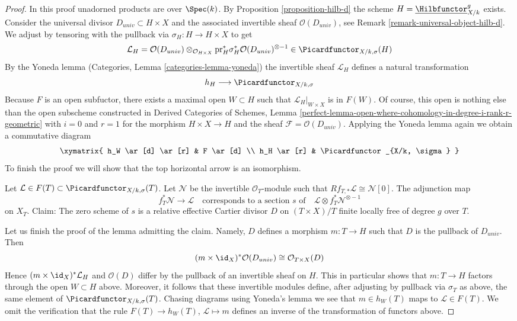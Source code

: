 \begin{proof}
In this proof unadorned products are over $\Spec(k)$.
By Proposition \ref{proposition-hilb-d} the scheme
$H = \underline{\Hilbfunctor}^g_{X/k}$ exists.
Consider the universal divisor $D_{univ} \subset H \times X$
and the associated invertible sheaf $\mathcal{O}(D_{univ})$, see
Remark \ref{remark-universal-object-hilb-d}.
We adjust by tensoring with the pullback via
$\sigma_H : H \to H \times X$ to get
$$
\mathcal{L}_H =
\mathcal{O}(D_{univ})
\otimes_{\mathcal{O}_{H \times X}}
\text{pr}_H^*\sigma_H^*\mathcal{O}(D_{univ})^{\otimes -1}
\in
\Picardfunctor_{X/k, \sigma}(H)
$$
By the Yoneda lemma (Categories, Lemma \ref{categories-lemma-yoneda})
the invertible sheaf $\mathcal{L}_H$ defines a natural transformation
$$
h_H \longrightarrow \Picardfunctor_{X/k, \sigma}
$$
Because $F$ is an open subfuctor, there exists a maximal open
$W \subset H$ such that $\mathcal{L}_H|_{W \times X}$ is in
$F(W)$. Of course, this open is nothing else than the
open subscheme constructed in
Derived Categories of Schemes, Lemma
\ref{perfect-lemma-open-where-cohomology-in-degree-i-rank-r-geometric}
with $i = 0$ and $r = 1$ for the morphism $H \times X \to H$ and the sheaf
$\mathcal{F} = \mathcal{O}(D_{univ})$. Applying the Yoneda lemma
again we obtain a commutative diagram
$$
\xymatrix{
h_W \ar[d] \ar[r] & F \ar[d] \\
h_H \ar[r] & \Picardfunctor_{X/k, \sigma}
}
$$
To finish the proof we will show that the top horizontal arrow is an
isomorphism.

\medskip\noindent
Let $\mathcal{L} \in F(T) \subset \Picardfunctor_{X/k, \sigma}(T)$.
Let $\mathcal{N}$ be the invertible $\mathcal{O}_T$-module
such that $Rf_{T, *}\mathcal{L} \cong \mathcal{N}[0]$.
The adjunction map
$$
f_T^*\mathcal{N} \longrightarrow \mathcal{L}
\quad\text{corresponds to a section }s\text{ of}\quad
\mathcal{L} \otimes f_T^*\mathcal{N}^{\otimes -1}
$$
on $X_T$. Claim: The zero scheme of $s$ is a relative effective Cartier
divisor $D$ on $(T \times X)/T$ finite locally free of degree $g$ over $T$.

\medskip\noindent
Let us finish the proof of the lemma admitting the claim.
Namely, $D$ defines a morphism $m : T \to H$ such that $D$ is the pullback of
$D_{univ}$. Then
$$
(m \times \id_X)^*\mathcal{O}(D_{univ}) \cong
\mathcal{O}_{T \times X}(D)
$$
Hence $(m \times \id_X)^*\mathcal{L}_H$ and $\mathcal{O}(D)$
differ by the pullback of an invertible sheaf on $H$. This in particular
shows that $m : T \to H$ factors through the open $W \subset H$ above.
Moreover, it follows that these invertible modules define, after adjusting
by pullback via $\sigma_T$ as above, the same element of
$\Picardfunctor_{X/k, \sigma}(T)$. Chasing diagrams using Yoneda's lemma
we see that $m \in h_W(T)$ maps to $\mathcal{L} \in F(T)$. We omit
the verification that the rule $F(T) \to h_W(T)$,
$\mathcal{L} \mapsto m$ defines an inverse of the transformation
of functors above.


\end{proof}
